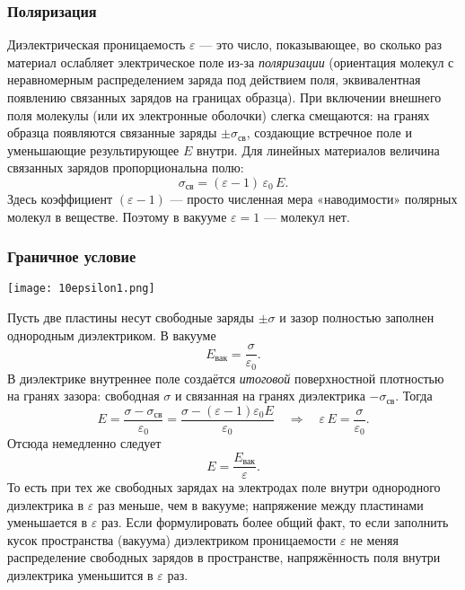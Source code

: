 \documentclass[12pt, a4paper]{article}%
\begin{document}
\subsubsection*{Поляризация}
Диэлектрическая проницаемость $\varepsilon$ — это число, показывающее, во сколько раз материал ослабляет электрическое поле из-за \textit{поляризации} (ориентация молекул с неравномерным распределением заряда под действием поля, эквивалентная появлению связанных зарядов на границах образца). При включении внешнего поля молекулы (или их электронные оболочки) слегка смещаются: на гранях образца появляются связанные заряды $\pm\sigma_{\text{св}}$, создающие встречное поле и уменьшающие результирующее $E$ внутри. Для линейных материалов величина связанных зарядов пропорциональна полю:
\[
\sigma_{\text{св}} = (\varepsilon-1)\,\varepsilon_0\,E.
\]
Здесь коэффициент $(\varepsilon-1)$ — просто численная мера «наводимости» полярных молекул в веществе. Поэтому в вакууме $\varepsilon = 1$ --- молекул нет.

\subsubsection*{Граничное условие}

\begin{center}
\texttt{[image: 10epsilon1.png]}
\label{fig:mpr}
\end{center}

Пусть две пластины несут свободные заряды $\pm\sigma$ и зазор полностью заполнен однородным диэлектриком. В вакууме
\[
E_{\text{вак}}=\frac{\sigma}{\varepsilon_0}.
\]
В диэлектрике внутреннее поле создаётся \emph{итоговой} поверхностной плотностью на гранях зазора: свободная $\sigma$ и связанная на гранях диэлектрика $-\sigma_{\text{св}}$. Тогда
\[
E=\frac{\sigma-\sigma_{\text{св}}}{\varepsilon_0}=\frac{\sigma-(\varepsilon-1)\varepsilon_0 E}{\varepsilon_0}
\quad\Longrightarrow\quad
\varepsilon\,E=\frac{\sigma}{\varepsilon_0}.
\]
Отсюда немедленно следует
\[
\boxed{\,E=\frac{E_{\text{вак}}}{\varepsilon}.\,}
\]
То есть при тех же свободных зарядах на электродах поле внутри однородного диэлектрика в $\varepsilon$ раз меньше, чем в вакууме; напряжение между пластинами уменьшается в $\varepsilon$ раз. Если формулировать более общий факт, то если заполнить кусок пространства (вакуума) диэлектриком проницаемости $\varepsilon$ не меняя распределение свободных зарядов в пространстве, напряжённость поля внутри диэлектрика уменьшится в $\varepsilon$ раз.
\end{document}
